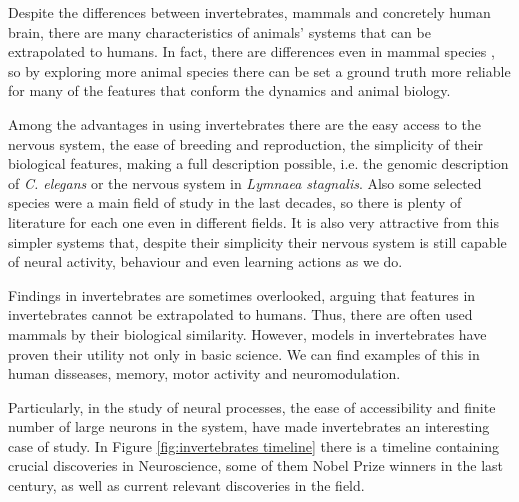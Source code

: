 Despite the differences between invertebrates, mammals and concretely human brain, there are many characteristics of animals' systems that can be extrapolated to humans. In fact, there are differences even in mammal species \cite{preuss}, so by exploring more animal species there can be set a ground truth more reliable for many of the features that conform the dynamics and animal biology. 


Among the advantages in using invertebrates there are the easy access to the nervous system, the ease of breeding and reproduction, the simplicity of their biological features, making a full description possible, i.e. the genomic description of \textit{C. elegans} or the nervous system in \textit{Lymnaea stagnalis}. Also some selected species were a main field of study in the last decades, so there is plenty of literature for each one even in different fields. It is also very attractive from this simpler systems that, despite their simplicity their nervous system is still capable of neural activity, behaviour and even learning actions as we do. 

Findings in invertebrates are sometimes overlooked, arguing that features in invertebrates cannot be extrapolated to humans. Thus, there are often used mammals by their biological similarity. However, models in invertebrates have proven their utility not only in basic science. We can find examples of this in human disseases, memory, motor activity and neuromodulation. 

Particularly, in the study of neural processes, the ease of accessibility and finite number of large neurons in the system, have made invertebrates an interesting case of study. In Figure \ref{fig:invertebrates timeline} there is a timeline containing crucial discoveries in Neuroscience, some of them Nobel Prize winners in the last century, as well as current relevant discoveries in the field. 

